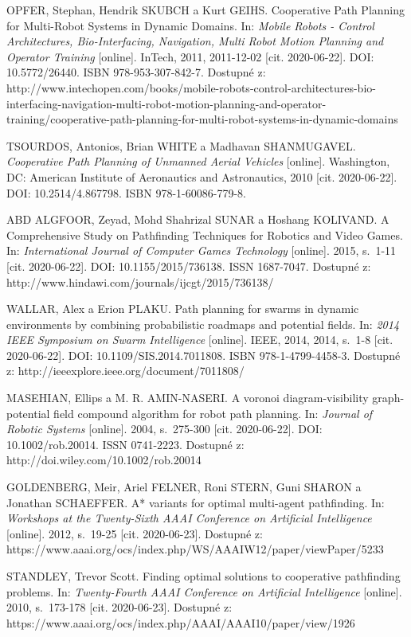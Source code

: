 \begin{thebibliography}{99}
OPFER, Stephan, Hendrik SKUBCH a Kurt GEIHS. Cooperative Path Planning for Multi-Robot Systems in Dynamic Domains. In: \textit{Mobile Robots - Control Architectures, Bio-Interfacing, Navigation, Multi Robot Motion Planning and Operator Training} [online]. InTech, 2011, 2011-12-02 [cit. 2020-06-22]. DOI: 10.5772/26440. ISBN 978-953-307-842-7. Dostupné z: http://www.intechopen.com/books/mobile-robots-control-architectures-bio-interfacing-navigation-multi-robot-motion-planning-and-operator-training/cooperative-path-planning-for-multi-robot-systems-in-dynamic-domains

TSOURDOS, Antonios, Brian WHITE a Madhavan SHANMUGAVEL. \textit{Cooperative Path Planning of Unmanned Aerial Vehicles} [online]. Washington, DC: American Institute of Aeronautics and Astronautics, 2010 [cit. 2020-06-22]. DOI: 10.2514/4.867798. ISBN 978-1-60086-779-8.

ABD ALGFOOR, Zeyad, Mohd Shahrizal SUNAR a Hoshang KOLIVAND. A Comprehensive Study on Pathfinding Techniques for Robotics and Video Games. In: \textit{International Journal of Computer Games Technology} [online]. 2015, s.~1-11 [cit. 2020-06-22]. DOI: 10.1155/2015/736138. ISSN 1687-7047. Dostupné z: http://www.hindawi.com/journals/ijcgt/2015/736138/

WALLAR, Alex a Erion PLAKU. Path planning for swarms in dynamic environments by combining probabilistic roadmaps and potential fields. In: \textit{2014 IEEE Symposium on Swarm Intelligence} [online]. IEEE, 2014, 2014, s.~1-8 [cit. 2020-06-22]. DOI: 10.1109/SIS.2014.7011808. ISBN 978-1-4799-4458-3. Dostupné z: http://ieeexplore.ieee.org/document/7011808/

MASEHIAN, Ellips a M. R. AMIN-NASERI. A voronoi diagram-visibility graph-potential field compound algorithm for robot path planning. In: \textit{Journal of Robotic Systems} [online]. 2004, s.~275-300 [cit. 2020-06-22]. DOI: 10.1002/rob.20014. ISSN 0741-2223. Dostupné z: http://doi.wiley.com/10.1002/rob.20014

GOLDENBERG, Meir, Ariel FELNER, Roni STERN, Guni SHARON a Jonathan SCHAEFFER. A* variants for optimal multi-agent pathfinding. In: \textit{Workshops at the Twenty-Sixth AAAI Conference on Artificial Intelligence} [online]. 2012, s.~19-25 [cit. 2020-06-23]. Dostupné z: https://www.aaai.org/ocs/index.php/WS/AAAIW12/paper/viewPaper/5233

STANDLEY, Trevor Scott. Finding optimal solutions to cooperative pathfinding problems. In: \textit{Twenty-Fourth AAAI Conference on Artificial Intelligence} [online]. 2010, s.~173-178 [cit. 2020-06-23]. Dostupné z: https://www.aaai.org/ocs/index.php/AAAI/AAAI10/paper/view/1926


\end{thebibliography}
